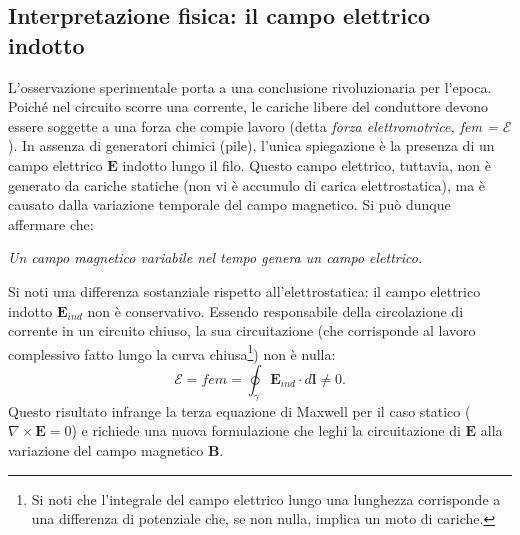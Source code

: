 \documentclass[a4paper,11pt]{report}
\begin{document}
\subsection{Interpretazione fisica: il campo elettrico indotto}
L'osservazione sperimentale porta a una conclusione rivoluzionaria per l'epoca. Poiché nel circuito scorre una corrente, le cariche libere del conduttore devono essere soggette a una forza che compie lavoro (detta \textit{forza elettromotrice, fem = $\mathcal{E}$}).
In assenza di generatori chimici (pile), l'unica spiegazione è la presenza di un {campo elettrico} $\bm{E}$ indotto lungo il filo.
\noindent
Questo campo elettrico, tuttavia, non è generato da cariche statiche (non vi è accumulo di carica elettrostatica), ma è causato dalla variazione temporale del campo magnetico.
Si può dunque affermare che:
\begin{center}
    \textit{Un campo magnetico variabile nel tempo genera un campo elettrico.}
\end{center}
Si noti una differenza sostanziale rispetto all'elettrostatica: il campo elettrico indotto $\bm{E}_{ind}$ non è conservativo. Essendo responsabile della circolazione di corrente in un circuito chiuso, la sua circuitazione (che corrisponde al lavoro complessivo fatto lungo la curva chiusa\footnote{Si noti che l'integrale del campo elettrico lungo una lunghezza corrisponde a una differenza di potenziale che, se non nulla, implica un moto di cariche.}) non è nulla:
\begin{equation}
   \mathcal{E} = fem = \oint_{\gamma} \bm{E}_{ind} \cdot d\bm{l} \neq 0.
\end{equation}
Questo risultato infrange la terza equazione di Maxwell per il caso statico ($\nabla \times \bm{E} = 0$) e richiede una nuova formulazione che leghi la circuitazione di $\bm{E}$ alla variazione del campo magnetico $\bm{B}$.
\end{document}
